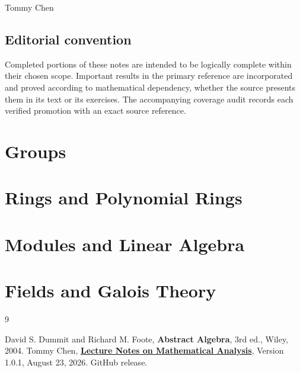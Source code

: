\documentclass[11pt,oneside,openany]{book}
\theoremstyle{definition}
\theoremstyle{remark}
\renewcommand{\emph}[1]{\textbf{#1}}
\begin{document}
\vspace{1.5em}
\noindent
Tommy Chen
\tableofcontents
\clearpage
\hypersetup{pageanchor=true}
\chapter*{Editorial convention}
Completed portions of these notes are intended to be logically complete within their chosen scope.  Important
results in the primary reference are incorporated and proved according to
mathematical dependency, whether the source presents them in its text or its
exercises.  The accompanying coverage audit records each verified promotion
with an exact source reference.
\mainmatter
\setcounter{chapter}{-1}

\part{Groups}


\part{Rings and Polynomial Rings}


\part{Modules and Linear Algebra}




\part{Fields and Galois Theory}



\backmatter
\begin{thebibliography}{9}
\raggedright
{} David S. Dummit and Richard M. Foote,
\emph{Abstract Algebra}, 3rd ed., Wiley, 2004.
 Tommy Chen, \href{https://github.com/tommychen99/mathematical-analysis/releases/tag/v1.0.1}{\emph{Lecture Notes on Mathematical Analysis}}, Version 1.0.1, August 23, 2026.
GitHub release.
\end{thebibliography}
\end{document}
